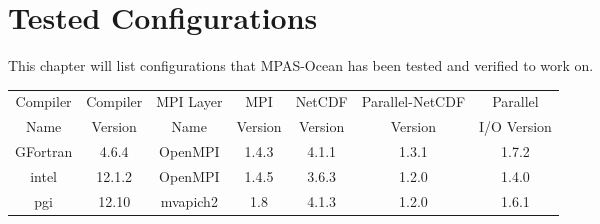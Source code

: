 \chapter{Tested Configurations}
\label{chap:tested-configurations}
This chapter will list configurations that MPAS-Ocean has been tested and verified to work on.


\begin{tabular}{| c | c | c | c | c | c | c |}
	\hline
	Compiler & Compiler & MPI Layer & MPI & NetCDF & Parallel-NetCDF & Parallel \\
	Name & Version & Name & Version & Version & Version & I/O Version \\
	\hline
	GFortran & 4.6.4 & OpenMPI & 1.4.3 & 4.1.1 & 1.3.1 & 1.7.2  \\
	\hline
	intel & 12.1.2 & OpenMPI & 1.4.5 & 3.6.3 & 1.2.0 & 1.4.0 \\
	\hline
	pgi & 12.10 & mvapich2 & 1.8 & 4.1.3  & 1.2.0  & 1.6.1  \\
	\hline
\end{tabular}

